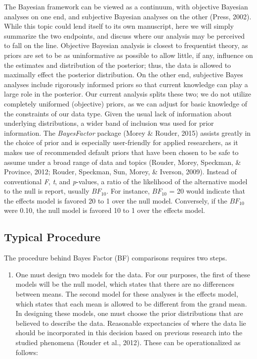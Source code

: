 \documentclass[english,man]{apa6}
\providecommand{\tightlist}{%
  \setlength{\itemsep}{0pt}\setlength{\parskip}{0pt}}
\theoremstyle{definition}
\theoremstyle{definition}
\theoremstyle{definition}
\theoremstyle{remark}
\begin{document}
The Bayesian framework can be viewed as a continuum, with objective
Bayesian analyses on one end, and subjective Bayesian analyses on the
other (Press, 2002). While this topic could lend itself to its own
manuscript, here we will simply summarize the two endpoints, and discuss
where our analysis may be perceived to fall on the line. Objective
Bayesian analysis is closest to frequentist theory, as priors are set to
be as uninformative as possible to allow little, if any, influence on
the estimates and distribution of the posterior; thus, the data is
allowed to maximally effect the posterior distribution. On the other
end, subjective Bayes analyses include rigorously informed priors so
that current knowledge can play a large role in the posterior. Our
current analysis splits these two; we do not utilize completely
uniformed (objective) priors, as we can adjust for basic knowledge of
the constraints of our data type. Given the usual lack of information
about underlying distributions, a wider band of inclusion was used for
prior information. The \emph{BayesFactor} package (Morey \& Rouder,
2015) assists greatly in the choice of prior and is especially
user-friendly for applied researchers, as it makes use of recommended
default priors that have been chosen to be safe to assume under a broad
range of data and topics (Rouder, Morey, Speckman, \& Province, 2012;
Rouder, Speckman, Sun, Morey, \& Iverson, 2009). Instead of conventional
\emph{F}, \emph{t}, and \emph{p}-values, a ratio of the likelihood of
the alternative model to the null is report, usually \(BF_{10}\). For
instance, \(BF_{10}\) = 20 would indicate that the effects model is
favored 20 to 1 over the null model. Conversely, if the \(BF_{10}\) were
0.10, the null model is favored 10 to 1 over the effects model.

\subsection{Typical Procedure}\label{typical-procedure}

The procedure behind Bayes Factor (BF) comparisons requires two steps.

\begin{enumerate}
\def\labelenumi{\arabic{enumi})}
\tightlist
\item
  One must design two models for the data. For our purposes, the first
  of these models will be the null model, which states that there are no
  differences between means. The second model for these analyses is the
  effects model, which states that each mean is allowed to be different
  from the grand mean. In designing these models, one must choose the
  prior distributions that are believed to describe the data. Reasonable
  expectancies of where the data lie should be incorporated in this
  decision based on previous research into the studied phenomena (Rouder
  et al., 2012). These can be operationalized as follows:
\end{enumerate}
\end{document}
